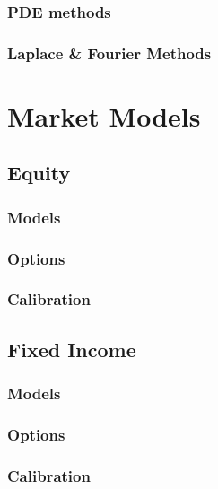 \documentclass{book}
\begin{document}
\section{PDE methods}
\label{sec:pde-methods}

\section{Laplace \& Fourier Methods}
\label{sec:laplace--fourier}


\part{Market Models}
\label{part:market-models}

\chapter{Equity}
\label{cha:equity}

\section{Models}
\label{sec:eq-models}

\section{Options}
\label{sec:eq-options}

\section{Calibration}
\label{sec:eq-calibration}



\chapter{Fixed Income}
\label{cha:fixed-income}

\section{Models}
\label{sec:fi-models}

\section{Options}
\label{sec:fi-options}

\section{Calibration}
\label{sec:fi-calibration}
\end{document}
